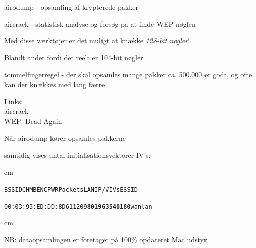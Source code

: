 \documentclass[20pt,landscape,a4paper,footrule]{foils}
\begin{document}


\begin{list1}
\item airodump - opsamling af krypterede pakker
\item aircrack - statistisk analyse og forsøg på at finde WEP nøglen
\item Med disse værktøjer er det muligt at knække \emph{128-bit nøgler}!
\item Blandt andet fordi det reelt er 104-bit nøgler \smiley
\item tommelfingerregel - der skal opsamles mange pakker ca. 500.000
  er godt, og ofte kan der knækkes med lang færre
\item Links:\\
 aircrack\\
 WEP: Dead Again
\end{list1}


\begin{list1}
\item Når airodump kører opsamles pakkerne
\item samtidig vises antal initialisationsvektorer IV's:
\end{list1}

 cm

\begin{alltt}
\hlktiny
   BSSID              CH  MB  ENC  PWR  Packets   LAN IP / # IVs   ESSID

   00:03:93:ED:DD:8D   6  11       209   {\bf 801963                  540180}   wanlan
\end{alltt}

 cm

\begin{list1}
\item NB: dataopsamlingen er foretaget på 100\% opdateret Mac udstyr
\end{list1}


\end{document}
